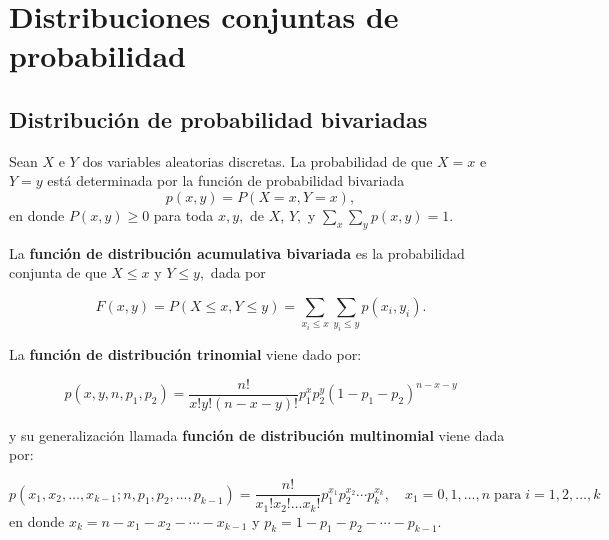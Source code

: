 \chapter{Distribuciones conjuntas de probabilidad}

\section{Distribución de probabilidad bivariadas}

\begin{tcolorbox}
    \begin{def.}
	Sean $X$ e $Y$ dos variables aleatorias discretas. La probabilidad de que $X=x$ e $Y=y$ está determinada por la función de probabilidad bivariada
	$$p(x,y)=P(X=x, Y=x),$$
	en donde $P(x,y)\geq 0$ para toda $x,y,$ de $X$, $Y,$ y $\sum_x \sum_y p(x,y)=1.$
    \end{def.}
\end{tcolorbox}

La \textbf{función de distribución acumulativa bivariada} es la probabilidad conjunta de que $X\leq x$ y $Y\leq y,$ dada por
\begin{tcolorbox}
    $$F(x,y)=P(X\leq x, Y\leq y) = \sum_{x_i\leq x}\sum_{y_i\leq y} p(x_i,y_i).$$
\end{tcolorbox}

La \textbf{función de distribución trinomial} viene dado por:

\begin{tcolorbox}
    $$p(x,y,n,p_1,p_2)=\dfrac{n!}{x!y!(n-x-y)!}p_1^x p_2^y (1-p_1-p_2)^{n-x-y}$$
\end{tcolorbox}
 
y su generalización llamada \textbf{función de distribución multinomial} viene dada por:

\begin{tcolorbox}
    $$p(x_1,x_2,\ldots, x_{k-1};n,p_1,p_2,\ldots,p_{k-1})=\dfrac{n!}{x_1!x_2!\ldots x_k!}p_1^{x_1}p_2^{x_2}\cdots p_k^{x_k}, \quad x_1=0,1,\ldots, n\; \mbox{para}\; i=1,2,\ldots, k$$
    en donde $x_k=n-x_1-x_2-\cdots - x_{k-1}$ y $p_k=1-p_1-p_2-\cdots - p_{k-1}.$
\end{tcolorbox}

\begin{tcolorbox}
    \begin{def.}
    \end{def.}
\end{tcolorbox}

